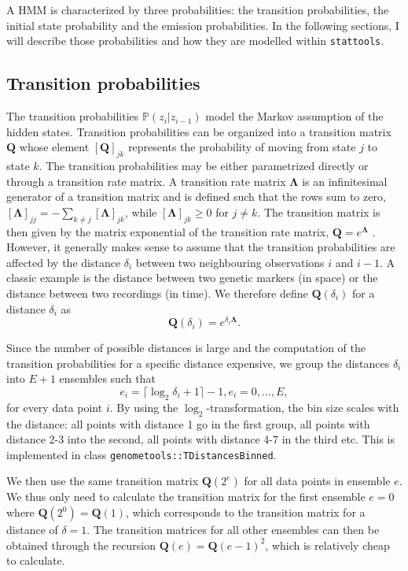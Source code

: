 \documentclass[a4paper,11pt]{article}
\def\Q{\boldsymbol{Q}}
\def\bLambda{\boldsymbol{\Lambda}}
\def\p{\mathbb{P}}
\def\stattools{\texttt{stattools}}
\newcommand{\class}[1]{\texttt{#1}}
\begin{document}
A HMM is characterized by three probabilities: the transition probabilities, the initial state probability and the emission probabilities. In the following sections, I will describe those probabilities and how they are modelled within \stattools{}.

\subsection{Transition probabilities}\label{section:TransitionProbabilities}
The transition probabilities $\p(z_i|z_{i-1})$ model the Markov assumption of the hidden states. Transition probabilities can be organized into a transition matrix $\Q$ whose element $[\Q]_{jk}$ represents the probability of moving from state $j$ to state $k$. The transition probabilities may be either parametrized directly or through a transition rate matrix.
A transition rate matrix $\bLambda$ is an infinitesimal generator of a transition matrix and is defined such that the rows sum to zero, $[\bLambda]_{jj} = -\sum_{k\neq j} [\bLambda]_{jk}$, while $[\bLambda]_{jk} \geq 0$ for $j \neq k$. The transition matrix is then given by the matrix exponential of the transition rate matrix, $\Q = e^{\bLambda}$ \citep{suhov2008}. However, it generally makes sense to assume that the transition probabilities are affected by the distance $\delta_i$ between two neighbouring observations $i$ and $i-1$. A classic example is the distance between two genetic markers (in space) or the distance between two recordings (in time). We therefore define $\Q(\delta_i)$ for a distance $\delta_i$ as
 \begin{equation*}
  \Q(\delta_i) = e^{\delta_i \bLambda}.
 \end{equation*}

Since the number of possible distances is large and the computation of the transition probabilities for a specific distance expensive, we group the distances $\delta_i$ into $E+1$ ensembles such that
\begin{equation}\label{eq:distGroups}
 e_i = \lceil \log_2 \delta_i + 1 \rceil - 1 , e_i = 0,\ldots,E,
\end{equation}
for every data point $i$. By using the $\log_2$-transformation, the bin size scales with the distance: all points with distance 1 go in the first group, all points with distance 2-3 into the second, all points with distance 4-7 in the third etc. This is implemented in class \class{genometools::TDistancesBinned}.

We then use the same transition matrix $\Q(2^e)$ for all data points in ensemble $e$. We thus only need to calculate the transition matrix for the first ensemble $e=0$ where $\Q(2^0) = \Q(1)$, which corresponds to the transition matrix for a distance of $\delta = 1$. The transition matrices for all other ensembles can then be obtained through the recursion $\Q(e) = \Q{(e - 1)}^2$, which is relatively cheap to calculate.
\end{document}

